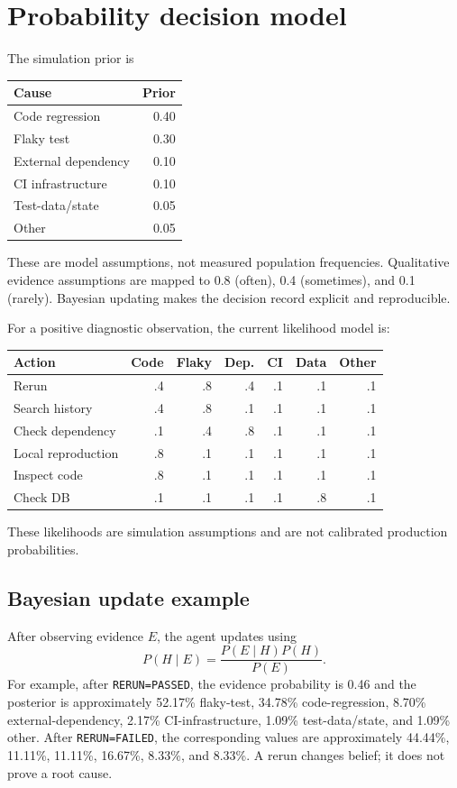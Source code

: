 \documentclass[11pt]{article}
\begin{document}
\section{Probability decision model}
The simulation prior is
\begin{center}
\begin{tabular}{lr}
\toprule
Cause & Prior\\
\midrule
Code regression & 0.40\\
Flaky test & 0.30\\
External dependency & 0.10\\
CI infrastructure & 0.10\\
Test-data/state & 0.05\\
Other & 0.05\\
\bottomrule
\end{tabular}
\end{center}
These are model assumptions, not measured population frequencies. Qualitative evidence assumptions are mapped to 0.8 (often), 0.4 (sometimes), and 0.1 (rarely). Bayesian updating makes the decision record explicit and reproducible.

For a positive diagnostic observation, the current likelihood model is:
\begin{center}
\small
\begin{tabular}{lrrrrrr}
\toprule
Action & Code & Flaky & Dep. & CI & Data & Other\\
\midrule
Rerun & .4 & .8 & .4 & .1 & .1 & .1\\
Search history & .4 & .8 & .1 & .1 & .1 & .1\\
Check dependency & .1 & .4 & .8 & .1 & .1 & .1\\
Local reproduction & .8 & .1 & .1 & .1 & .1 & .1\\
Inspect code & .8 & .1 & .1 & .1 & .1 & .1\\
Check DB & .1 & .1 & .1 & .1 & .8 & .1\\
\bottomrule
\end{tabular}
\end{center}
These likelihoods are simulation assumptions and are not calibrated production probabilities.

\subsection{Bayesian update example}
After observing evidence $E$, the agent updates using
\[
P(H\mid E)=\frac{P(E\mid H)P(H)}{P(E)}.
\]
For example, after \texttt{RERUN=PASSED}, the evidence probability is 0.46 and the posterior is approximately 52.17\% flaky-test, 34.78\% code-regression, 8.70\% external-dependency, 2.17\% CI-infrastructure, 1.09\% test-data/state, and 1.09\% other. After \texttt{RERUN=FAILED}, the corresponding values are approximately 44.44\%, 11.11\%, 11.11\%, 16.67\%, 8.33\%, and 8.33\%. A rerun changes belief; it does not prove a root cause.
\end{document}
